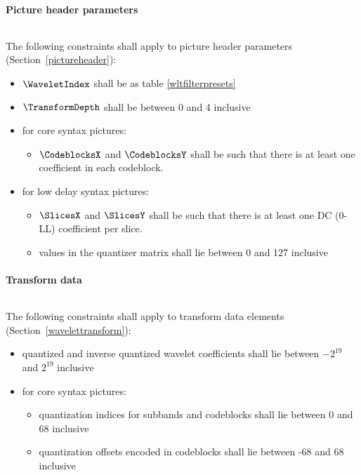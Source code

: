 \paragraph{Picture header parameters}$\ $\newline

The following constraints shall apply to picture header parameters
(Section~\ref{pictureheader}):
\begin{itemize}
\item $\WaveletIndex$ shall be as table \ref{wltfilterpresets}
\item $\TransformDepth$ shall be between 0 and 4 inclusive
\item for core syntax pictures:
    \begin{itemize}
    \item $\CodeblocksX$ and $\CodeblocksY$ shall be such that there is 
    at least one coefficient in each codeblock.
    \end{itemize}
\item for low delay syntax pictures:
    \begin{itemize}
    \item $\SlicesX$ and $\SlicesY$ shall be such that there is at least one 
    DC (0-LL) coefficient per slice.
    \item values in the quantizer matrix shall lie between 0 and 127 inclusive
    \end{itemize}
\end{itemize}

\paragraph{Transform data}$\ $\newline

The following constraints shall apply to transform data elements 
(Section~\ref{wavelettransform}):
\begin{itemize}
\item quantized and inverse quantized wavelet coefficients shall lie 
between $-2^{19}$ and $2^{19}$ inclusive
\item for core syntax pictures:
    \begin{itemize}
    \item quantization indices for subbands and codeblocks shall lie between 
    0 and 68 inclusive 
    \item quantization offsets encoded in codeblocks shall lie between 
    -68 and 68 inclusive
    \end{itemize} 
\end{itemize} 

